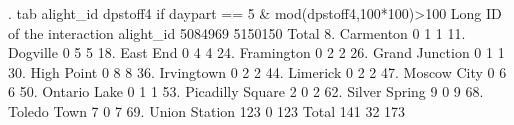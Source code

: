 . tab alight_id dpstoff4 if daypart == 5 \& mod(dpstoff4,100*100)>100
{\smallskip}
                      {\VBAR}    Long ID of the
                      {\VBAR}      interaction
            alight_id {\VBAR}   5084969    5150150 {\VBAR}     Total
         8. Carmenton {\VBAR}         0          1 {\VBAR}         1 
         11. Dogville {\VBAR}         0          5 {\VBAR}         5 
         18. East End {\VBAR}         0          4 {\VBAR}         4 
       24. Framington {\VBAR}         0          2 {\VBAR}         2 
   26. Grand Junction {\VBAR}         0          1 {\VBAR}         1 
       30. High Point {\VBAR}         0          8 {\VBAR}         8 
       36. Irvingtown {\VBAR}         0          2 {\VBAR}         2 
         44. Limerick {\VBAR}         0          2 {\VBAR}         2 
      47. Moscow City {\VBAR}         0          6 {\VBAR}         6 
     50. Ontario Lake {\VBAR}         0          1 {\VBAR}         1 
 53. Picadilly Square {\VBAR}         2          0 {\VBAR}         2 
    62. Silver Spring {\VBAR}         9          0 {\VBAR}         9 
      68. Toledo Town {\VBAR}         7          0 {\VBAR}         7 
    69. Union Station {\VBAR}       123          0 {\VBAR}       123 
                Total {\VBAR}       141         32 {\VBAR}       173 
{\smallskip}
{\smallskip}
